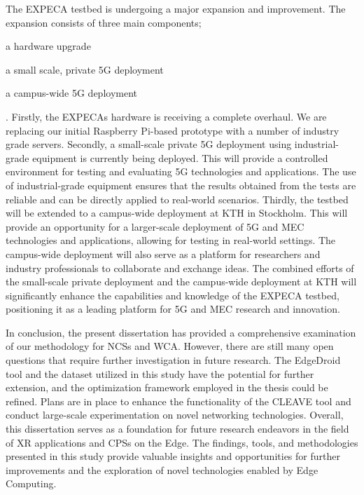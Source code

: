 The \gls{EXPECA} testbed is undergoing a major expansion and improvement.
The expansion consists of three main components;
\begin{inlineenum}
    \item a hardware upgrade
    \item a small scale, private 5G deployment
    \item a campus-wide 5G deployment
\end{inlineenum}.
Firstly, the \gls{EXPECA}s hardware is receiving a complete overhaul.
We are replacing our initial Raspberry Pi-based prototype with a number of industry grade servers.
Secondly, a small-scale private 5G deployment using industrial-grade equipment is currently being deployed.
This will provide a controlled environment for testing and evaluating 5G technologies and applications.
The use of industrial-grade equipment ensures that the results obtained from the tests are reliable and can be directly applied to real-world scenarios.
Thirdly, the testbed will be extended to a campus-wide deployment at \gls{KTH} in Stockholm.
This will provide an opportunity for a larger-scale deployment of 5G and \gls{MEC} technologies and applications, allowing for testing in real-world settings.
The campus-wide deployment will also serve as a platform for researchers and industry professionals to collaborate and exchange ideas.
The combined efforts of the small-scale private deployment and the campus-wide deployment at \gls{KTH} will significantly enhance the capabilities and knowledge of the \gls{EXPECA} testbed, positioning it as a leading platform for 5G and \gls{MEC} research and innovation.

\medskip

In conclusion, the present dissertation has provided a comprehensive examination of our methodology for \glspl{NCS} and \gls{WCA}.
However, there are still many open questions that require further investigation in future research.
The EdgeDroid tool and the dataset utilized in this study have the potential for further extension, and the optimization framework employed in the thesis could be refined.
Plans are in place to enhance the functionality of the CLEAVE tool and conduct large-scale experimentation on novel networking technologies.
Overall, this dissertation serves as a foundation for future research endeavors in the field of \gls{XR} applications and \glspl{CPS} on the Edge.
The findings, tools, and methodologies presented in this study provide valuable insights and opportunities for further improvements and the exploration of novel technologies enabled by Edge Computing.